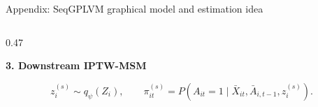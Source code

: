 \documentclass[aspectratio=169,12pt]{beamer}
\newcommand{\muted}[1]{\textcolor{PrimerMuted}{#1}}
\newcommand{\pstrong}[1]{{\bfseries #1}}
\newcommand{\smallref}[1]{\vspace{0.15cm}{\fontsize{5.8}{7}\selectfont\muted{#1}}}
\begin{document}
\begin{frame}{Appendix: SeqGPLVM graphical model and estimation idea}
\begin{columns}[T,onlytextwidth]
\begin{column}{0.47\textwidth}
{\vspace{0.05cm}
\pstrong{3. Downstream IPTW-MSM}

\vspace{-0.45cm}
\[
z_i^{(s)}\sim q_\psi(Z_i),\qquad
\pi_{it}^{(s)}
=
P(A_{it}=1\mid \bar X_{it},\bar A_{i,t-1},z_i^{(s)}).
\]

\vspace{-0.45cm}

\vspace{-0.25cm}
}

\end{column}

\end{columns}


\end{frame}
\end{document}
